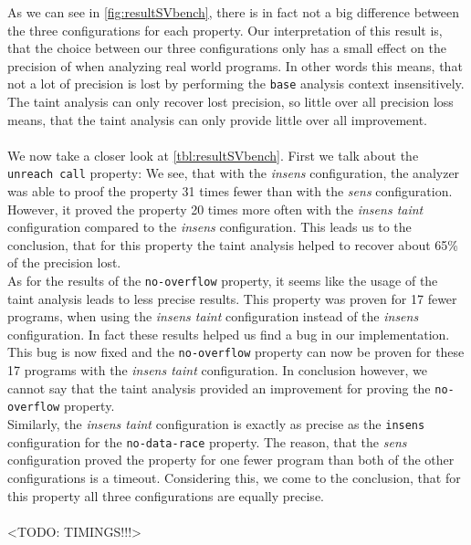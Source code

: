       As we can see in \autoref{fig:resultSVbench}, there is in fact not a big difference between the three configurations for each property. Our interpretation of this result is, that the choice between our three configurations only has a small effect on the precision of \gob when analyzing real world programs. In other words this means, that not a lot of precision is lost by performing the \texttt{base} analysis context insensitively. The taint analysis can only recover lost precision, so little over all precision loss means, that the taint analysis can only provide little over all improvement.\\
      \\
      We now take a closer look at \autoref{tbl:resultSVbench}. First we talk about the \texttt{unreach call} property:
      We see, that with the \textit{insens} configuration, the analyzer was able to proof the property 31 times fewer than with the \textit{sens} configuration. However, it proved the property 20 times more often with the \textit{insens taint} configuration compared to the \textit{insens} configuration. This leads us to the conclusion, that for this property the taint analysis helped to recover about 65\% of the precision lost.\\
      As for the results of the \texttt{no-overflow} property, it seems like the usage of the taint analysis leads to less precise results. This property was proven for 17 fewer programs, when using the \textit{insens taint} configuration instead of the \textit{insens} configuration. In fact these results helped us find a bug in our implementation. This bug is now fixed and the \texttt{no-overflow} property can now be proven for these 17 programs with the \textit{insens taint} configuration. In conclusion however, we cannot say that the taint analysis provided an improvement for proving the \texttt{no-overflow} property.\\
      Similarly, the \textit{insens taint} configuration is exactly as precise as the \texttt{insens} configuration for the \texttt{no-data-race} property. The reason, that the \textit{sens} configuration proved the property for one fewer program than both of the other configurations is a timeout. Considering this, we come to the conclusion, that for this property all three configurations are equally precise.\\
      \\
      <TODO: TIMINGS!!!>

